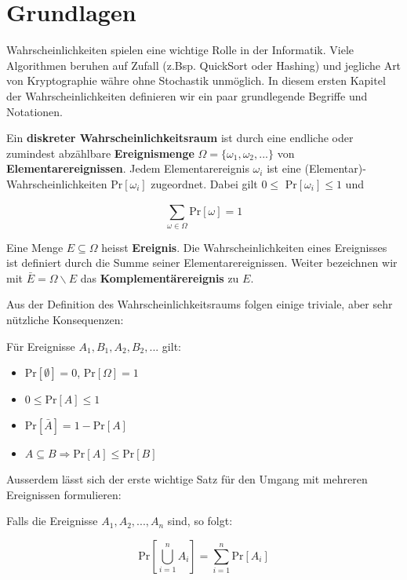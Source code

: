 \chapter{Grundlagen}

Wahrscheinlichkeiten spielen eine wichtige Rolle in der Informatik. Viele Algorithmen beruhen auf
Zufall (z.Bsp. QuickSort oder Hashing) und jegliche Art von Kryptographie währe ohne Stochastik 
unmöglich. In diesem ersten Kapitel der Wahrscheinlichkeiten definieren wir ein paar grundlegende 
Begriffe und Notationen.

\begin{definition}
    Ein \textbf{diskreter Wahrscheinlichkeitsraum} ist durch eine endliche oder zumindest abzählbare
    \textbf{Ereignismenge} $\Omega = \{ \omega_1, \omega_2, ...  \}$ von \textbf{Elementarereignissen}. 
    Jedem Elementarereignis $\omega_i$ ist eine (Elementar)-Wahrscheinlichkeiten Pr$[\omega_i]$
    zugeordnet. Dabei gilt $0 \leq$  Pr$[\omega_i] \leq 1$ und 

    $$\sum_{\omega \in \Omega}^{} \text{Pr} [\omega] = 1$$

    Eine Menge $E \subseteq \Omega$ heisst \textbf{Ereignis}. Die Wahrscheinlichkeiten eines Ereignisses
    ist definiert durch die Summe seiner Elementarereignissen. Weiter bezeichnen wir mit $\bar{E} = \Omega \backslash E$
    das \textbf{Komplementärereignis} zu $E$.
\end{definition}
\bigskip

Aus der Definition des Wahrscheinlichkeitsraums folgen einige triviale, aber sehr nützliche 
Konsequenzen:

\begin{satz}[Satz]
    Für Ereignisse $A_1, B_1, A_2, B_2, ...$ gilt:
    \begin{itemize}
        \item Pr$[\emptyset] = 0$, Pr$[\Omega] = 1$
        \item $0 \leq \text{Pr}[A] \leq 1$
        \item Pr$[\bar{A}] = 1 - \text{Pr}[A]$
        \item $A \subseteq B \Rightarrow \text{Pr}[A] \leq \text{Pr}[B]$
    \end{itemize}
\end{satz}
\bigskip

Ausserdem lässt sich der erste wichtige Satz für den Umgang mit mehreren Ereignissen formulieren:

\begin{satz}[Additionssatz]
    Falls die Ereignisse $A_1, A_2, ... , A_n$  sind, so folgt:

    $$\text{Pr}[ \bigcup_{i=1}^{n} A_i] = \sum_{i = 1}^{n} \text{Pr}[A_i]$$
\end{satz}
\bigskip

